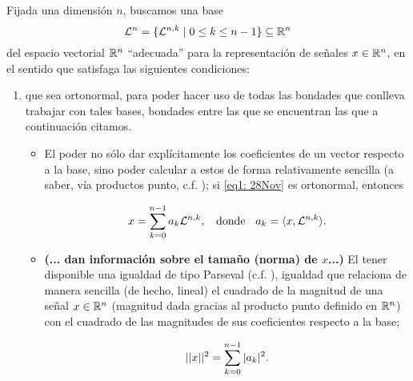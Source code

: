 \noindent 
\begin{listaObj}
\label{lista de objetivos}
Fijada una dimensión $n$, 
buscamos una base 
\begin{equation}
\label{eq1: 28Nov}
\mathcal{L}^{n}=\{ \mathcal{L}^{n,k} \hspace{0.1cm} |
\hspace{0.1cm} 0 \leq k \leq n-1  \} \subseteq \mathbb{R}^{n} 
\end{equation}
del espacio vectorial
$\mathbb{R}^{n}$ ``adecuada'' para la representación de señales
$x \in \mathbb{R}^{n}$,
en el sentido que satisfaga
las siguientes condiciones: 

\begin{enumerate}
\item 
que
sea ortonormal, para poder hacer uso de todas
las bondades que conlleva 
trabajar con tales bases, 
bondades entre las que se encuentran
las que a continuación citamos.
\begin{itemize}
\item 
\textbf{}
El poder no sólo dar explícitamente los coeficientes
de un vector respecto a la base, 
sino poder calcular a estos
de forma relativamente sencilla (a saber, vía productos punto,
c.f. ); si
\eqref{eq1: 28Nov} es ortonormal, entonces

\begin{equation}
\label{eq2: 13Feb}
x= \sum\limits_{k=0}^{n-1}a_{k}\mathcal{L}^{n,k},
\hspace{0.2cm} \text{ donde } \hspace{0.2cm}
a_{k}= \langle x , \mathcal{L}^{n,k} \rangle.
\end{equation}
\item
\textbf{\textcolor{ameMorado}{(... dan información sobre el tamaño (norma) de $x$...)}}
El tener disponible una igualdad de tipo Parseval
(c.f. ), igualdad que
relaciona de manera sencilla (de hecho, lineal)
el cuadrado de
la magnitud de una señal $x \in \mathbb{R}^{n}$ (magnitud dada
gracias al producto punto definido en $\mathbb{R}^{n}$)
con el cuadrado de las magnitudes de sus coeficientes
respecto a la base;

\[
||x||^{2}= \sum\limits_{k=0}^{n-1}|a_{k}|^{2}.
\]


\end{itemize}
\end{enumerate}
\end{listaObj}
